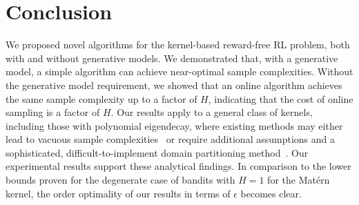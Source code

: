 \section{Conclusion}
\label{sec:conclusion}

We proposed novel algorithms for the kernel-based reward-free RL problem, both with and without generative models. We demonstrated that, with a generative model, a simple algorithm can achieve near-optimal sample complexities. Without the generative model requirement, we showed that an online algorithm achieves the same sample complexity up to a factor of $H$, indicating that the cost of online sampling is a factor of $H$. Our results apply to a general class of kernels, including those with polynomial eigendecay, where existing methods may either lead to vacuous sample complexities~\citep{qiu2021reward} or require additional assumptions and a sophisticated, difficult-to-implement domain partitioning method~\citep{vakilireward}. Our experimental results support these analytical findings. In comparison to the lower bounds proven for the degenerate case of bandits with $H=1$ for the Matérn kernel, the order optimality of our results in terms of $\epsilon$ becomes clear.




